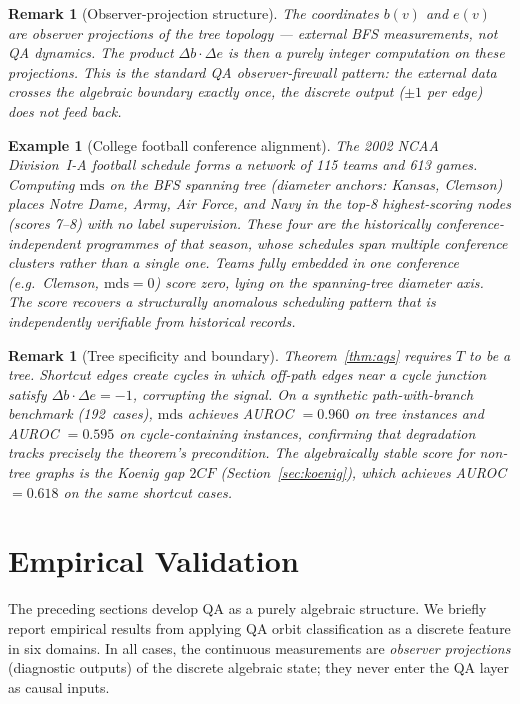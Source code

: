 \documentclass[11pt]{article}
\newtheorem{remark}[definition]{Remark}
\newtheorem{example}[definition]{Example}
\begin{document}
\begin{remark}[Observer-projection structure]
The coordinates $b(v)$ and $e(v)$ are \emph{observer projections} of the tree
topology --- external BFS measurements, not QA dynamics.  The product $\Delta b \cdot \Delta e$
is then a purely integer computation on these projections.  This is the standard
QA observer-firewall pattern: the external data crosses the algebraic boundary exactly once,
the discrete output ($\pm 1$ per edge) does not feed back.
\end{remark}

\begin{example}[College football conference alignment]
The 2002 NCAA Division~I-A football schedule forms a network of 115 teams and 613
games.  Computing $\mathrm{mds}$ on the BFS spanning tree (diameter anchors: Kansas,
Clemson) places Notre Dame, Army, Air Force, and Navy in the top-8 highest-scoring
nodes (scores 7--8) with no label supervision.  These four are the historically
conference-independent programmes of that season, whose schedules span multiple
conference clusters rather than a single one.  Teams fully embedded in one conference
(e.g.\ Clemson, $\mathrm{mds} = 0$) score zero, lying on the spanning-tree diameter
axis.  The score recovers a structurally anomalous scheduling pattern that is
independently verifiable from historical records.
\end{example}

\begin{remark}[Tree specificity and boundary]
Theorem~\ref{thm:ags} requires $T$ to be a tree.  Shortcut edges create cycles
in which off-path edges near a cycle junction satisfy $\Delta b \cdot \Delta e = -1$,
corrupting the signal.  On a synthetic path-with-branch benchmark (192~cases),
$\mathrm{mds}$ achieves AUROC $= 0.960$ on tree instances and AUROC $= 0.595$ on
cycle-containing instances, confirming that degradation tracks precisely the
theorem's precondition.  The algebraically stable score for non-tree graphs is the
Koenig gap $2CF$ (Section~\ref{sec:koenig}), which achieves AUROC $= 0.618$ on the
same shortcut cases.
\end{remark}

\section{Empirical Validation}\label{sec:empirical}

The preceding sections develop QA as a purely algebraic structure.  We briefly report empirical results from applying QA orbit classification as a discrete feature in six domains.  In all cases, the continuous measurements are \emph{observer projections} (diagnostic outputs) of the discrete algebraic state; they never enter the QA layer as causal inputs.
\end{document}
